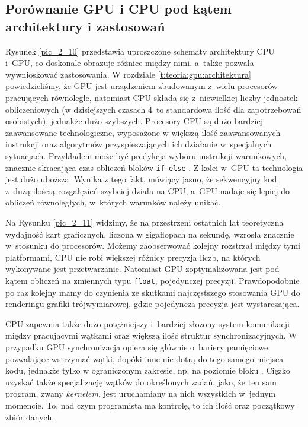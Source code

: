 		\subsection{Porównanie GPU i CPU pod kątem architektury i zastosowań}
		\label{t:teoria:gpu:porownanie}
		
		
		Rysunek \ref{pic_2_10} przedstawia uproszczone schematy architektury CPU i~GPU, co doskonale obrazuje różnice między nimi, a~także pozwala wywnioskować zastosowania. W rozdziale \ref{t:teoria:gpu:architektura} powiedzieliśmy, że GPU jest urządzeniem zbudowanym z~wielu procesorów pracujących równolegle, natomiast CPU składa się z~niewielkiej liczby jednostek obliczeniowych (w dzisiejszych czasach 4~to standardowa ilość dla zapotrzebowań osobistych), jednakże dużo szybszych. Procesory CPU są dużo bardziej zaawansowane technologiczne, wyposażone w większą ilość zaawansowanych instrukcji oraz algorytmów przyspieszających ich działanie w~specjalnych sytuacjach. Przykładem może być predykcja wyboru instrukcji warunkowych, znacznie skracająca czas obliczeń bloków \texttt{if-else} \cite{branch_prediction_wiki}. Z kolei w~GPU ta technologia jest dużo uboższa. Wynika z tego fakt, mówiący jasno, że sekwencyjny kod z~dużą ilością rozgałęzień szybciej działa na CPU, a~GPU nadaje się lepiej do obliczeń równoległych, w~których warunków należy unikać. 
		
		
		Na Rysunku \ref{pic_2_11} widzimy, że na przestrzeni ostatnich lat teoretyczna wydajność kart graficznych, liczona w gigaflopach na sekundę, wzrosła znacznie w~stosunku do procesorów. Możemy zaobserwować kolejny rozstrzał między tymi platformami, CPU nie robi większej różnicy precyzja liczb, na których wykonywane jest przetwarzanie. Natomiast GPU zoptymalizowana jest pod kątem obliczeń na zmiennych typu \texttt{float}, pojedynczej precyzji. Prawdopodobnie po raz kolejny mamy do czynienia ze skutkami najczęstszego stosowania GPU do renderingu grafiki trójwymiarowej, gdzie pojedyncza precyzja jest wystarczająca.
		
		CPU zapewnia także dużo potężniejszy i~bardziej złożony system komunikacji między pracującymi wątkami oraz większą ilość struktur synchronizacyjnych. W przypadku GPU synchronizacja opiera się głównie o~bariery pamięciowe, pozwalające wstrzymać wątki, dopóki inne nie dotrą do tego samego miejsca kodu, jednakże tylko w ograniczonym zakresie, np. na poziomie bloku \cite{cuda}. Ciężko uzyskać także specjalizację wątków do określonych zadań, jako, że ten sam program, zwany \emph{kernelem}, jest uruchamiany na nich wszystkich w~jednym momencie. To, nad czym programista ma kontrolę, to ich ilość oraz początkowy zbiór danych.
		
